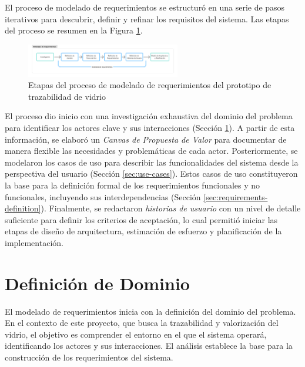 El proceso de modelado de requerimientos se estructuró en una serie de pasos iterativos para descubrir, definir y refinar los requisitos del sistema. Las etapas del proceso se resumen en la Figura \ref{fig:requirements-modelling-process}.

\begin{figure}[!htpb]
    \centering
    \includegraphics[width=0.6\textwidth]{Figures/requirements-modelling.png}
    \caption{Etapas del proceso de modelado de requerimientos del prototipo de trazabilidad de vidrio}
    \label{fig:requirements-modelling-process}
\end{figure}

El proceso dio inicio con una investigación exhaustiva del dominio del problema para identificar los actores clave y sus interacciones (Sección \ref{sec:domain-definition}). A partir de esta información, se elaboró un \textit{Canvas de Propuesta de Valor} para documentar de manera flexible las necesidades y problemáticas de cada actor. Posteriormente, se modelaron los casos de uso para describir las funcionalidades del sistema desde la perspectiva del usuario (Sección \ref{sec:use-cases}). Estos casos de uso constituyeron la base para la definición formal de los requerimientos funcionales y no funcionales, incluyendo sus interdependencias (Sección \ref{sec:requirements-definition}). Finalmente, se redactaron \textit{historias de usuario} con un nivel de detalle suficiente para definir los criterios de aceptación, lo cual permitió iniciar las etapas de diseño de arquitectura, estimación de esfuerzo y planificación de la implementación.

\section{Definición de Dominio}
\label{sec:domain-definition}

El modelado de requerimientos inicia con la definición del dominio del problema. En el contexto de este proyecto, que busca la trazabilidad y valorización del vidrio, el objetivo es comprender el entorno en el que el sistema operará, identificando los actores y sus interacciones. El análisis establece la base para la construcción de los requerimientos del sistema.

